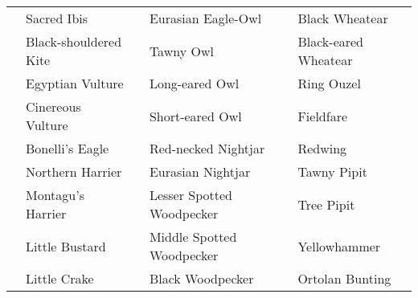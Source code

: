 \documentclass{article}
\begin{document}
\begin{center}
\begin{tabularx}{\textwidth}{cXcXcX}
\underline{\hspace{3ex}} 	 &Sacred Ibis 	 &\underline{\hspace{3ex}} 	 &Eurasian Eagle-Owl 	 &\underline{\hspace{3ex}} 	 &Black Wheatear \\ 
\underline{\hspace{3ex}} 	 &Black-shouldered Kite 	 &\underline{\hspace{3ex}} 	 &Tawny Owl 	 &\underline{\hspace{3ex}} 	 &Black-eared Wheatear \\ 
\underline{\hspace{3ex}} 	 &Egyptian Vulture 	 &\underline{\hspace{3ex}} 	 &Long-eared Owl 	 &\underline{\hspace{3ex}} 	 &Ring Ouzel \\ 
\underline{\hspace{3ex}} 	 &Cinereous Vulture 	 &\underline{\hspace{3ex}} 	 &Short-eared Owl 	 &\underline{\hspace{3ex}} 	 &Fieldfare \\ 
\underline{\hspace{3ex}} 	 &Bonelli's Eagle 	 &\underline{\hspace{3ex}} 	 &Red-necked Nightjar 	 &\underline{\hspace{3ex}} 	 &Redwing \\ 
\underline{\hspace{3ex}} 	 &Northern Harrier 	 &\underline{\hspace{3ex}} 	 &Eurasian Nightjar 	 &\underline{\hspace{3ex}} 	 &Tawny Pipit \\ 
\underline{\hspace{3ex}} 	 &Montagu's Harrier 	 &\underline{\hspace{3ex}} 	 &Lesser Spotted Woodpecker 	 &\underline{\hspace{3ex}} 	 &Tree Pipit \\ 
\underline{\hspace{3ex}} 	 &Little Bustard 	 &\underline{\hspace{3ex}} 	 &Middle Spotted Woodpecker 	 &\underline{\hspace{3ex}} 	 &Yellowhammer \\ 
\underline{\hspace{3ex}} 	 &Little Crake 	 &\underline{\hspace{3ex}} 	 &Black Woodpecker 	 &\underline{\hspace{3ex}} 	 &Ortolan Bunting \\ 

\end{tabularx}
\end{center}
\end{document}
